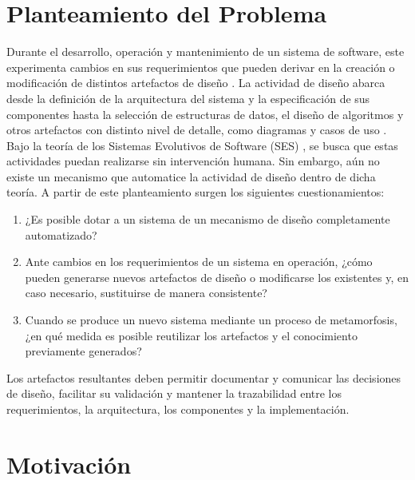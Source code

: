 \documentclass[12pt, letterpaper, oneside]{book}
\begin{document}
\section{Planteamiento del Problema}
Durante el desarrollo, operación y mantenimiento de un sistema de software, este experimenta cambios en sus requerimientos que pueden derivar en la creación o modificación de distintos artefactos de diseño \cite{sommerville2011software}. La actividad de diseño abarca desde la definición de la arquitectura del sistema y la especificación de sus componentes hasta la selección de estructuras de datos, el diseño de algoritmos y otros artefactos con distinto nivel de detalle, como diagramas y casos de uso \cite{Kruchten1995The}. Bajo la teoría de los Sistemas Evolutivos de Software (SES) \cite{PerezCarrillo2026}, se busca que estas actividades puedan realizarse sin intervención humana. Sin embargo, aún no existe un mecanismo que automatice la actividad de diseño dentro de dicha teoría. A partir de este planteamiento surgen los siguientes cuestionamientos: 
\begin{enumerate} 
	\item ¿Es posible dotar a un sistema de un mecanismo de diseño completamente automatizado? 
	\item Ante cambios en los requerimientos de un sistema en operación, ¿cómo pueden generarse nuevos artefactos de diseño o modificarse los existentes y, en caso necesario, sustituirse de manera consistente? 
	\item Cuando se produce un nuevo sistema mediante un proceso de metamorfosis, ¿en qué medida es posible reutilizar los artefactos y el conocimiento previamente generados? 
\end{enumerate} 
Los artefactos resultantes deben permitir documentar y comunicar las decisiones de diseño, facilitar su validación y mantener la trazabilidad entre los requerimientos, la arquitectura, los componentes y la implementación.

\section{Motivación}
\end{document}
